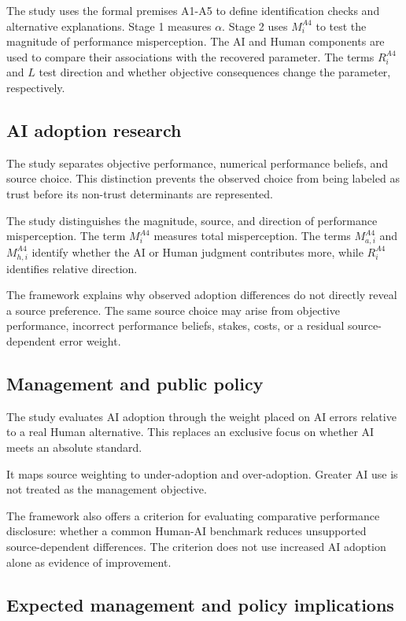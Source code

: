 \documentclass[11pt,a4paper]{article}
\begin{document}
The study uses the formal premises A1-A5 to define identification checks and alternative explanations. Stage 1 measures $\alpha$. Stage 2 uses $M_i^{A4}$ to test the magnitude of performance misperception. The AI and Human components are used to compare their associations with the recovered parameter. The terms $R_i^{A4}$ and $L$ test direction and whether objective consequences change the parameter, respectively.

\subsection{AI adoption research}

The study separates objective performance, numerical performance beliefs, and source choice. This distinction prevents the observed choice from being labeled as trust before its non-trust determinants are represented.

The study distinguishes the magnitude, source, and direction of performance misperception. The term $M_i^{A4}$ measures total misperception. The terms $M_{a,i}^{A4}$ and $M_{h,i}^{A4}$ identify whether the AI or Human judgment contributes more, while $R_i^{A4}$ identifies relative direction.

The framework explains why observed adoption differences do not directly reveal a source preference. The same source choice may arise from objective performance, incorrect performance beliefs, stakes, costs, or a residual source-dependent error weight.

\subsection{Management and public policy}

The study evaluates AI adoption through the weight placed on AI errors relative to a real Human alternative. This replaces an exclusive focus on whether AI meets an absolute standard.

It maps source weighting to under-adoption and over-adoption. Greater AI use is not treated as the management objective.

The framework also offers a criterion for evaluating comparative performance disclosure: whether a common Human-AI benchmark reduces unsupported source-dependent differences. The criterion does not use increased AI adoption alone as evidence of improvement.

\subsection{Expected management and policy implications}
\end{document}
